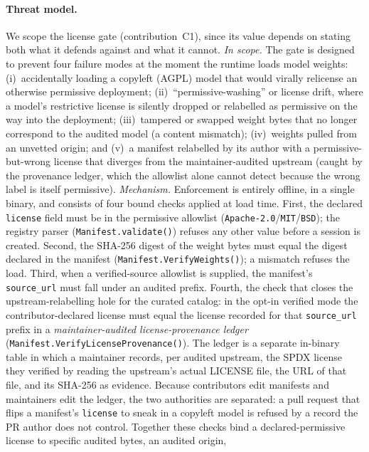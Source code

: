 \paragraph{Threat model.}
We scope the license gate (contribution~C1), since its value depends on
stating both what it defends against and what it cannot.
\emph{In scope.}  The gate is designed to prevent four failure modes at the moment the
runtime loads model weights:
(i)~accidentally loading a copyleft (AGPL) model that would virally relicense an otherwise
permissive deployment;
(ii)~``permissive-washing'' or license drift, where a model's restrictive license is
silently dropped or relabelled as permissive on the way into the deployment;
(iii)~tampered or swapped weight bytes that no longer correspond to the audited model
(a content mismatch);
(iv)~weights pulled from an unvetted origin; and
(v)~a manifest relabelled by its author with a permissive-but-wrong license that diverges from
the maintainer-audited upstream (caught by the provenance ledger, which the allowlist alone
cannot detect because the wrong label is itself permissive).
\emph{Mechanism.}  Enforcement is entirely offline, in a single binary, and consists of
four bound checks applied at load time.
First, the declared \texttt{license} field must be in the permissive allowlist
(\texttt{Apache-2.0}/\texttt{MIT}/\texttt{BSD}); the registry parser
(\texttt{Manifest.validate()}) refuses any other value before a session is created.
Second, the SHA-256 digest of the weight bytes must equal the digest declared in the
manifest (\texttt{Manifest.VerifyWeights()}); a mismatch refuses the load.
Third, when a verified-source allowlist is supplied, the manifest's \texttt{source\_url}
must fall under an audited prefix.
Fourth, the check that closes the upstream-relabelling hole for the curated
catalog: in the opt-in verified mode the contributor-declared license must equal the
license recorded for that \texttt{source\_url} prefix in a \emph{maintainer-audited
license-provenance ledger} (\texttt{Manifest.VerifyLicenseProvenance()}).  The ledger is a
separate in-binary table in which a maintainer records, per audited upstream, the SPDX license
they verified by reading the upstream's actual LICENSE file, the URL of that file, and its
SHA-256 as evidence.  Because contributors edit manifests and maintainers edit the ledger, the
two authorities are separated: a pull request that flips a manifest's \texttt{license} to
sneak in a copyleft model is refused by a record the PR author does not control.  Together these
checks bind a declared-permissive license to specific audited bytes, an audited origin,
